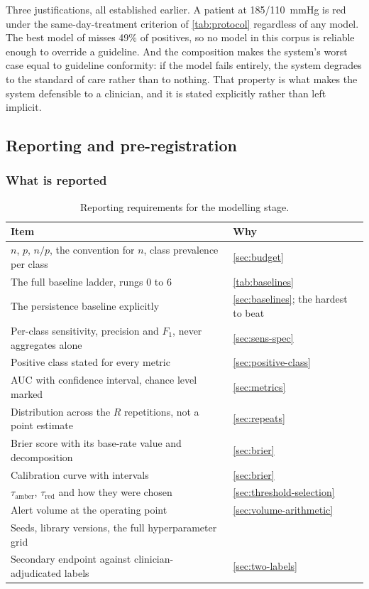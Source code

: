 \documentclass[12pt,a4paper,oneside]{report}
\begin{document}
Three justifications, all established earlier. A patient at 185/110~mmHg is red under the same-day-treatment criterion of \cref{tab:protocol} regardless of any model. The best model of \textcite{mendoza2025} misses 49\% of positives, so no model in this corpus is reliable enough to override a guideline. And the composition makes the system's worst case equal to guideline conformity: if the model fails entirely, the system degrades to the standard of care rather than to nothing. That property is what makes the system defensible to a clinician, and it is stated explicitly rather than left implicit.

\subsection{Reporting and pre-registration}\label{sec:reporting-prereg}

\subsubsection{What is reported}

\begin{table}[htbp]
\centering\footnotesize
\caption{Reporting requirements for the modelling stage.}\label{tab:model-reporting}
\begin{tabularx}{\textwidth}{@{}X >{\raggedright\arraybackslash}p{5.2cm}@{}}
\toprule
\textbf{Item} & \textbf{Why} \\
\midrule
$n$, $p$, $n/p$, the convention for $n$, class prevalence per class & \cref{sec:budget} \\
The full baseline ladder, rungs 0 to 6 & \cref{tab:baselines} \\
The persistence baseline explicitly & \cref{sec:baselines}; the hardest to beat \\
Per-class sensitivity, precision and $F_1$, never aggregates alone & \cref{sec:sens-spec} \\
Positive class stated for every metric & \cref{sec:positive-class} \\
AUC with confidence interval, chance level marked & \cref{sec:metrics} \\
Distribution across the $R$ repetitions, not a point estimate & \cref{sec:repeats} \\
Brier score with its base-rate value and decomposition & \cref{sec:brier} \\
Calibration curve with intervals & \cref{sec:brier} \\
$\tau_{\text{amber}}$, $\tau_{\text{red}}$ and how they were chosen & \cref{sec:threshold-selection} \\
Alert volume at the operating point & \cref{sec:volume-arithmetic} \\
Seeds, library versions, the full hyperparameter grid & \textcite{mendoza2025} \\
Secondary endpoint against clinician-adjudicated labels & \cref{sec:two-labels} \\
\bottomrule
\end{tabularx}
\end{table}
\end{document}
